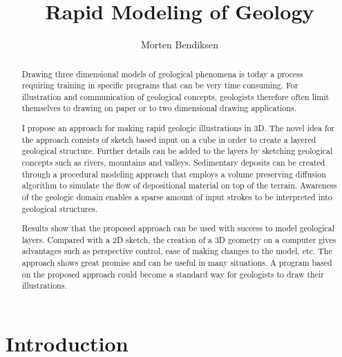 \documentclass{cescg}[2005/11/12]
\title{Rapid Modeling of Geology}
\author{Morten Bendiksen}
\begin{document}
\maketitle

\begin{abstract}
Drawing three dimensional models of geological phenomena is today a process requiring training in specific programs that can be very time consuming. For illustration and communication of geological concepts, geologists therefore often limit themselves to drawing on paper or to two dimensional drawing applications.

I propose an approach for making rapid geologic illustrations in 3D. The novel idea for the approach consists of sketch based input on a cube in order to create a layered geological structure. Further details can be added to the layers by sketching geological concepts such as rivers, mountains and valleys. Sedimentary deposits can be created through a procedural modeling approach that employs a volume preserving diffusion algorithm to simulate the flow of depositional material on top of the terrain. Awareness of the geologic domain enables a sparse amount of input strokes to be interpreted into geological structures.

Results show that the proposed approach can be used with success to model geological layers. Compared with a 2D sketch, the creation of a 3D geometry on a computer gives advantages such as perspective control, ease of making changes to the model, etc. The approach shows great promise and can be useful in many situations. A program based on the proposed approach could become a standard way for geologists to draw their illustrations.
\end{abstract}

\section{Introduction}
\end{document}
